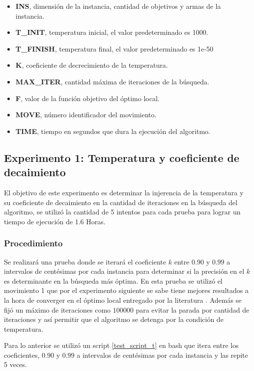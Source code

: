 \begin{itemize}
    \item \textbf{INS}, dimensión de la instancia, cantidad de objetivos y armas de la instancia.
    \item \textbf{T\_INIT}, temperatura inicial, el valor predeterminado es 1000.
    \item \textbf{T\_FINISH}, temperatura final, el valor predeterminado es 1e-50
    \item \textbf{K}, coeficiente de decrecimiento de la temperatura.
    \item \textbf{MAX\_ITER}, cantidad máxima de iteraciones de la búsqueda.
    \item \textbf{F}, valor de la función objetivo del óptimo local.
    \item \textbf{MOVE}, número identificador del movimiento.
    \item \textbf{TIME}, tiempo en segundos que dura la ejecución del algoritmo.
\end{itemize}


\subsection{Experimento 1: Temperatura y coeficiente de decaimiento}
El objetivo de este experimento es determinar la injerencia de la temperatura y su coeficiente de decaimiento en la cantidad de iteraciones en la búsqueda del algoritmo, se utilizó la cantidad de 5 intentos para cada prueba para lograr un tiempo de ejecución de 1.6 Horas.

\subsubsection{Procedimiento}
Se realizará una prueba donde se iterará el coeficiente $k$ entre $0.90$ y $0.99$ a intervalos de centésimas por cada instancia para determinar si la precisión en el $k$ es determinante en la búsqueda más óptima.
En esta prueba se utilizó el movimiento 1 que por el experimento siguiente se sabe tiene mejores resultados a la hora de converger en el óptimo local entregado por la literatura \cite{sonuc-2017}. Además se fijó un máximo de iteraciones como $100000$ para evitar la parada por cantidad de iteraciones y así permitir que el algoritmo se detenga por la condición de temperatura.

Para lo anterior se utilizó un script \ref{test_script_t} en bash que itera entre los coeficientes, $0.90$ y $0.99$ a intervalos de centésimas por cada instancia y las repite 5 veces.

